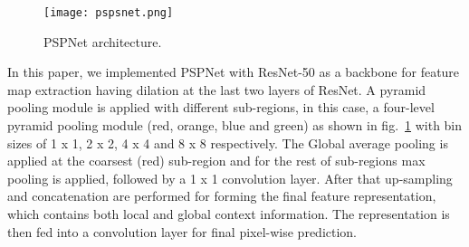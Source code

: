 	\begin{figure} [h!]
		\begin{center}
			\texttt{[image: pspsnet.png]}
		\end{center}
		\caption{PSPNet architecture.} 
		\label{fig:PSPNet}
	\end{figure}
	
	\begin{comment}As it is shown in the Figure that the initial feature maps are extracted from input images by employing ResNet architecture along with dilation. A pyramid pooling module is applied with different sub-region representations. After that up-sampling and concatenation are performed for forming the final feature representation, which contains both local and global context information. The representation is then fed into a convolution layer for final pixel wise prediction.\end{comment} 
	In this paper, we implemented PSPNet with ResNet-50 as a backbone for feature map extraction having dilation at the last two layers of ResNet.  A pyramid pooling module is applied with different sub-regions, in this case, a four-level pyramid pooling module (red, orange, blue and green) as shown in fig.~\ref{fig:PSPNet} with bin sizes of 1 x 1, 2 x 2, 4 x 4 and 8 x 8 respectively. The Global average pooling is applied at the coarsest (red) sub-region and for the rest of sub-regions max pooling is applied, followed by a 1 x 1 convolution layer. After that up-sampling and concatenation are performed for forming the final feature representation, which contains both local and global context information. The representation is then fed into a convolution layer for final pixel-wise prediction. 
	
\begin{comment}We have implemented two versions of PSPNet models:
1) With softmax activiation function. 2) and with sigmoid activation function, both at the output layer.\end{comment}